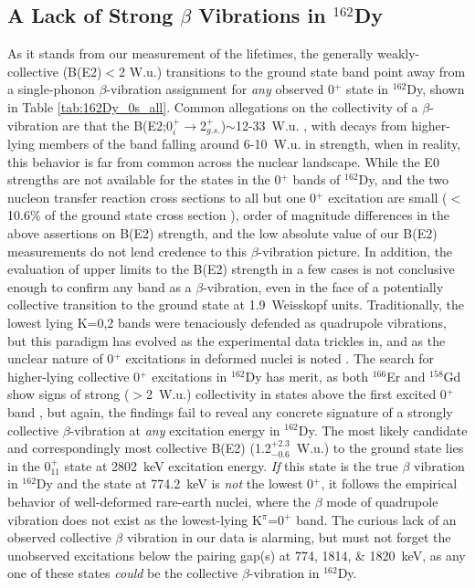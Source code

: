\subsection{A Lack of Strong $\beta$ Vibrations in $^{162}$Dy}
As it stands from our measurement of the lifetimes, the generally weakly-collective (B(E2)$<$2 W.u.) transitions to the ground state band point away from a single-phonon $\beta$-vibration assignment for \textit{any} observed 0$^+$ state in $^{162}$Dy, shown in Table \ref{tab:162Dy_0s_all}. Common allegations on the collectivity of a $\beta$-vibration are that the B(E2;0$_i^+\rightarrow$2$^+_{g.s.}$)$\sim$12-33~W.u. \cite{Garrett_betavib2001}, with decays from higher-lying members of the band falling around 6-10~W.u. in strength, when in reality, this behavior is far from common across the nuclear landscape. While the E0 strengths are not available for the states in the 0$^+$ bands of $^{162}$Dy, and the two nucleon transfer reaction cross sections to all but one 0$^+$ excitation are small ($<$10.6\% of the ground state cross section \cite{Meyer_pt0_2006}), order of magnitude differences in the above assertions on B(E2) strength, and the low absolute value of our B(E2) measurements do not lend credence to this $\beta$-vibration picture. In addition, the evaluation of upper limits to the B(E2) strength in a few cases is not conclusive enough to confirm any band as a $\beta$-vibration, even in the face of a potentially collective transition to the ground state at 1.9~Weisskopf units. Traditionally, the lowest lying K=0,2 bands were tenaciously defended as quadrupole vibrations, but this paradigm has evolved as the experimental data trickles in, and as the unclear nature of 0$^+$ excitations in deformed nuclei is noted \cite{SharpeySchafer_beta2011,Garrett_02_beta}. The search for higher-lying collective 0$^+$ excitations in $^{162}$Dy has merit, as both $^{166}$Er and $^{158}$Gd show signs of strong ($>$2~W.u.) collectivity in states above the first excited 0$^+$ band \cite{Lesher_158Gdmain, Garrett_twogammaEr_1997}, but again, the findings fail to reveal any concrete signature of a strongly collective $\beta$-vibration at \textit{any} excitation energy in $^{162}$Dy. The most likely candidate and correspondingly most collective B(E2) (1.2$^{+2.3}_{-0.6}$~W.u.) to the ground state lies in the 0$^+_{11}$ state at 2802~keV excitation energy. \textit{If} this state is the true $\beta$ vibration in $^{162}$Dy and the state at 774.2~keV is \textit{not} the lowest 0$^+$, it follows the empirical behavior of well-deformed rare-earth nuclei, where the $\beta$ mode of quadrupole vibration does not exist as the lowest-lying K$^\pi$=0$^+$ band. The curious lack of an observed collective $\beta$ vibration in our data is alarming, but must not forget the unobserved excitations below the pairing gap(s) at 774, 1814, \& 1820~keV, as any one of these states \textit{could} be the collective $\beta$-vibration in $^{162}$Dy.
